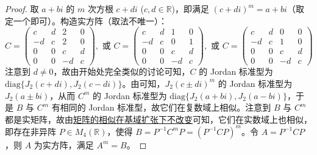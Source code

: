 \documentclass[../../main.tex]{subfiles}%
\begin{document}
\begin{proof}
取 $a + bi$ 的 $m$ 次方根 $c + di$ ($c,d\in\mathbb{R}$)，即满足 $(c + di)^m = a + bi$（取定一个即可）。构造实方阵（取法不唯一）：
\[
C = 
\begin{pmatrix}
c & d & 2 & 0 \\
-d & c & 2 & 0 \\
0 & 0 & c & d \\
0 & 0 & -d & c
\end{pmatrix}, \text{ 或 }
C = 
\begin{pmatrix}
c & d & 1 & 0 \\
-d & c & 0 & 1 \\
0 & 0 & c & d \\
0 & 0 & -d & c
\end{pmatrix}, \text{ 或 }
C = 
\begin{pmatrix}
c & d & 0 & 0 \\
-d & c & 1 & 0 \\
0 & 0 & c & d \\
0 & 0 & -d & c
\end{pmatrix}
\]
注意到 $d\neq 0$，故由开始处完全类似的讨论可知，$C$ 的 Jordan 标准型为 $\mathrm{diag}\{J_2(c + di),J_2(c - di)\}$。由可知，$J_2(c\pm di)^m$ 的 Jordan 标准型为 $J_2(a\pm bi)$，从而 $C^m$ 的 Jordan 标准型为 $\mathrm{diag}\{J_2(a + bi),J_2(a - bi)\}$，于是 $B$ 与 $C^m$ 有相同的 Jordan 标准型，故它们在复数域上相似。注意到 $B$ 与 $C^m$ 都是实矩阵，故由\hyperref[corollary:矩阵的相似关系在基域扩张下不变]{矩阵的相似在基域扩张下不改变}可知，它们在实数域上也相似，即存在非异阵 $P\in M_4(\mathbb{R})$，使得 $B = P^{-1}C^mP = (P^{-1}CP)^m$。令 $A = P^{-1}CP$，则 $A$ 为实方阵，满足 $A^m = B$。

\end{proof}
\end{document}
